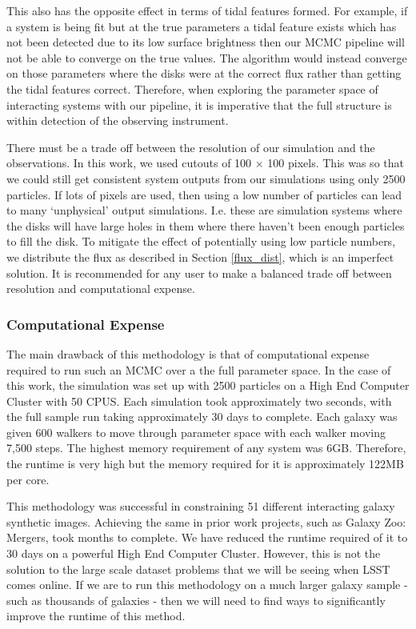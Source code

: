 This also has the opposite effect in terms of tidal features formed. For example, if a system is being fit but at the true parameters a tidal feature exists which has not been detected due to its low surface brightness then our MCMC pipeline will not be able to converge on the true values. The algorithm would instead converge on those parameters where the disks were at the correct flux rather than getting the tidal features correct. Therefore, when exploring the parameter space of interacting systems with our pipeline, it is imperative that the full structure is within detection of the observing instrument.

There must be a trade off between the resolution of our simulation and the observations. In this work, we used cutouts of 100 $\times$ 100 pixels. This was so that we could still get consistent system outputs from our simulations using only 2500 particles. If lots of pixels are used, then using a low number of particles can lead to many `unphysical' output simulations. I.e. these are simulation systems where the disks will have large holes in them where there haven't been enough particles to fill the disk. To mitigate the effect of potentially using low particle numbers, we distribute the flux as described in Section \ref{flux_dist}, which is an imperfect solution. It is recommended for any user to make a balanced trade off between resolution and computational expense.

\subsubsection{Computational Expense}\label{computational_expense}
\noindent The main drawback of this methodology is that of computational expense required to run such an MCMC over a the full parameter space. In the case of this work, the simulation was set up with 2500 particles on a High End Computer Cluster with 50 CPUS. Each simulation took approximately two seconds, with the full sample run taking approximately 30 days to complete. Each galaxy was given 600 walkers to move through parameter space with each walker moving 7,500 steps. The highest memory requirement of any system was 6GB. Therefore, the runtime is very high but the memory required for it is approximately 122MB per core.

This methodology was successful in constraining 51 different interacting galaxy synthetic images. Achieving the same in prior work projects, such as Galaxy Zoo: Mergers, took months to complete. We have reduced the runtime required of it to 30 days on a powerful High End Computer Cluster. However, this is not the solution to the large scale dataset problems that we will be seeing when LSST comes online. If we are to run this methodology on a much larger galaxy sample - such as thousands of galaxies - then we will need to find ways to significantly improve the runtime of this method.

